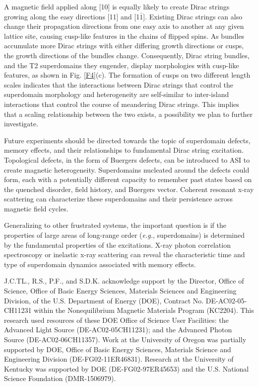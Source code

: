\documentclass[aps, prb, reprint, showpacs, superscriptaddress]{revtex4-1}
\begin{document}
A magnetic field applied along [10] is equally likely to create Dirac strings growing along the easy directions [11] and [1$\bar{1}$].
Existing Dirac strings can also change their propagation directions from one easy axis to another at any given lattice site, causing cusp-like features in the chains of flipped spins. 
As bundles accumulate more Dirac strings with either differing growth directions or cusps, the growth directions of the bundles change.
Consequently, Dirac string bundles, and the T2 superdomains they engender, display morphologies with cusp-like features, as shown in Fig. \ref{F4}(c).
The formation of cusps on two different length scales indicates that the interactions between Dirac strings that control the superdomain morphology and heterogeneity are self-similar to inter-island interactions that control the course of meandering Dirac strings.
This implies that a scaling relationship between the two exists, a possibility we plan to further investigate.

Future experiments should be directed towards the topic of superdomain defects, memory effects, and their relationships to fundamental Dirac string excitation.
Topological defects, in the form of Buergers defects, can be introduced to ASI to create magnetic heterogeneity.\cite{Drisko}
Superdomains nucleated around the defects could form, each with a potentially different capacity to remember past states based on the quenched disorder, field history, and Buergers vector.
Coherent resonant x-ray scattering can characterize these superdomains and their persistence across magnetic field cycles. 

Generalizing to other frustrated systems, the important question is if  the properties of large areas of long-range order (\textit{e.g.}, superdomains) is determined by the fundamental properties of the excitations.
X-ray photon correlation spectroscopy or inelastic x-ray scattering can reveal the characteristic time and type of superdomain dynamics associated with memory effects.

\begin{acknowledgments}
J.C.TL., R.S., P.F., and S.D.K. acknowledge support by the Director, Office of Science, Office of Basic Energy Sciences, Materials Sciences and Engineering Division, of the U.S. Department of Energy (DOE), Contract No. DE-AC02-05-CH11231 within the Nonequilibrium Magnetic Materials Program (KC2204).
This research used resources of these DOE Office of Science User Facilities: the Advanced Light Source (DE-AC02-05CH11231); and the Advanced Photon Source (DE-AC02-06CH11357).
Work at the University of Oregon was partially supported by DOE, Office of Basic Energy Sciences, Materials Science and Engineering Division (DE-FG02-11ER46831). 
Research at the University of Kentucky was supported by DOE (DE-FG02-97ER45653) and the U.S. National Science Foundation (DMR-1506979).
\end{acknowledgments}
\end{document}

